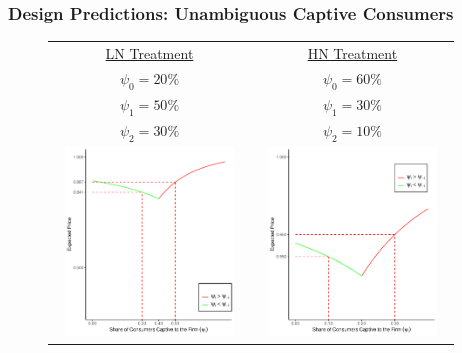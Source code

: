 \documentclass[red]{beamer}
\begin{document}
\begin{frame} [t]
\frametitle{Design Predictions: Unambiguous Captive Consumers}
\begin{figure} [h] 
\begin{center}
\begin{tabular}{c c}
\underline{LN Treatment} & \underline{HN Treatment} \\
$\psi_0 = 20\%$ & $\psi_0 = 60\%$ \\
$\psi_1 = 50\%$ & $\psi_1 = 30\%$ \\
$\psi_2 = 30\%$ & $\psi_2 = 10\%$ \\
\includegraphics[width=5cm,height=5cm]{AA20 (1).pdf} & \includegraphics[width=5cm,height=5cm]{AA60 (1).pdf}
\end{tabular}
\end{center}
\end{figure}
\end{frame}
\end{document}
